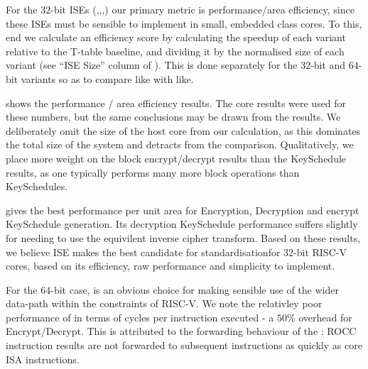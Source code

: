 For the $32$-bit ISEs 
(,,,)
our primary metric is
performance/area efficiency, since these ISEs must be sensible to
implement in small, embedded class cores.
To this, end we calculate an efficiency score by calculating the speedup
of each variant relative to the T-table baseline, and dividing it
by the normalised size of each variant
(see ``ISE Size'' column of ).
This is done separately for the $32$-bit and $64$-bit variants so as
to compare like with like.

 shows the performance / area efficiency results.
The  core results were used for these numbers, but the
same conclusions may be drawn from the  results.
We deliberately omit the size of the host core from our calculation,
as this dominates the total size of the system and detracts from
the comparison.
Qualitatively, we place more weight on the block encrypt/decrypt results
than the KeySchedule results, as one typically performs many more
block operations than KeySchedules.

 gives the best performance per unit area
for Encryption, Decryption and encrypt KeySchedule generation.
Its decryption KeySchedule performance suffers slightly for needing
to use the equivilent inverse cipher transform.
Based on these results, we believe ISE  makes the best candidate for
standardisationfor $32$-bit RISC-V cores,
based on its efficiency, raw performance and simplicity to implement.

For the $64$-bit case,  is an obvious choice for making
sensible use of the wider data-path within the constraints of RISC-V.
We note the relativley poor performance of  in terms of cycles
per instruction executed - a $50\%$ overhead for Encrypt/Decrypt.
This is attributed to the forwarding behaviour of the :
ROCC instruction results are not
forwarded to subsequent instructions as quickly as core ISA
instructions.

